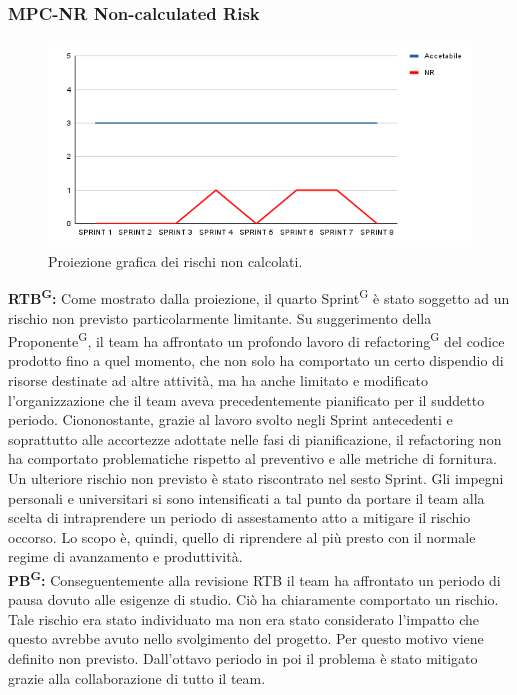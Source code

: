 \documentclass[8pt]{article}
\newcommand{\glossterm}[1]{#1\textsuperscript{G}} %
\begin{document}
\subsubsection{MPC-NR Non-calculated Risk}
\begin{figure}[h!]
    \centering
    \includegraphics[width=1\textwidth]{images_pdq/NR.png}
    \caption{Proiezione grafica dei rischi non calcolati.}
    \label{fig:Proiezione grafica dei rischi non calcolati}
\end{figure}
\textbf{\glossterm{RTB}:} Come mostrato dalla proiezione, il quarto \glossterm{Sprint} è stato soggetto ad un rischio non previsto particolarmente limitante. Su suggerimento della \glossterm{Proponente}, il team ha affrontato un profondo lavoro di \glossterm{refactoring} del codice prodotto fino a quel momento, che non solo ha comportato un certo dispendio di risorse destinate ad altre attività, ma ha anche limitato e modificato l'organizzazione che il team aveva precedentemente pianificato per il suddetto periodo. Ciononostante, grazie al lavoro svolto negli Sprint antecedenti e soprattutto alle accortezze adottate nelle fasi di pianificazione, il refactoring non ha comportato problematiche rispetto al preventivo e alle metriche di fornitura.\\
Un ulteriore rischio non previsto è stato riscontrato nel sesto Sprint. Gli impegni personali e universitari si sono intensificati a tal punto da portare il team alla scelta di intraprendere un periodo di assestamento atto a mitigare il rischio occorso. Lo scopo è, quindi, quello di riprendere al più presto con il normale regime di avanzamento e produttività.\\
\textbf{\glossterm{PB}:} Conseguentemente alla revisione RTB il team ha affrontato un periodo di pausa dovuto alle esigenze di studio. Ciò ha chiaramente comportato un rischio. Tale rischio era stato individuato ma non era stato considerato l'impatto che questo avrebbe avuto nello svolgimento del progetto. Per questo motivo viene definito non previsto. Dall'ottavo periodo in poi il problema è stato mitigato grazie alla collaborazione di tutto il team.
\end{document}

